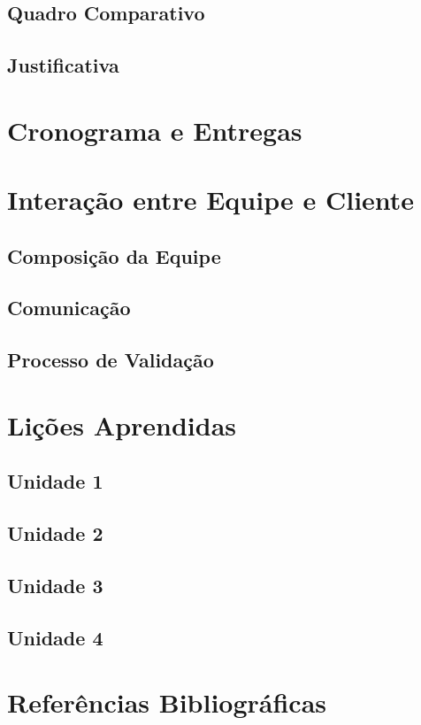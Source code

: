 \documentclass[12pt]{article}
\begin{document}
\subsection{Quadro Comparativo}


\subsection{Justificativa}

\section{Cronograma e Entregas}



\section{Interação entre Equipe e Cliente}

\subsection{Composição da Equipe}


\subsection{Comunicação}


\subsection{Processo de Validação}


\section{Lições Aprendidas}

\subsection{Unidade 1}

\subsection{Unidade 2}

\subsection{Unidade 3}

\subsection{Unidade 4}



\section{Referências Bibliográficas}
\end{document}
